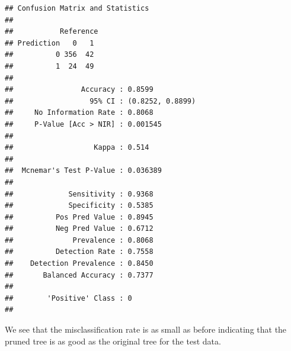 \documentclass[10pt,ignorenonframetext,]{beamer}
\newenvironment{Shaded}{\begin{snugshade}}{\end{snugshade}}
\newcommand{\KeywordTok}[1]{\textcolor[rgb]{0.13,0.29,0.53}{\textbf{#1}}}
\newcommand{\DataTypeTok}[1]{\textcolor[rgb]{0.13,0.29,0.53}{#1}}
\newcommand{\StringTok}[1]{\textcolor[rgb]{0.31,0.60,0.02}{#1}}
\newcommand{\OperatorTok}[1]{\textcolor[rgb]{0.81,0.36,0.00}{\textbf{#1}}}
\newcommand{\NormalTok}[1]{#1}
\begin{document}
\begin{frame}[fragile]

\footnotesize

\begin{Shaded}
\end{Shaded}

\begin{verbatim}
## Confusion Matrix and Statistics
## 
##           Reference
## Prediction   0   1
##          0 356  42
##          1  24  49
##                                           
##                Accuracy : 0.8599          
##                  95% CI : (0.8252, 0.8899)
##     No Information Rate : 0.8068          
##     P-Value [Acc > NIR] : 0.001545        
##                                           
##                   Kappa : 0.514           
##                                           
##  Mcnemar's Test P-Value : 0.036389        
##                                           
##             Sensitivity : 0.9368          
##             Specificity : 0.5385          
##          Pos Pred Value : 0.8945          
##          Neg Pred Value : 0.6712          
##              Prevalence : 0.8068          
##          Detection Rate : 0.7558          
##    Detection Prevalence : 0.8450          
##       Balanced Accuracy : 0.7377          
##                                           
##        'Positive' Class : 0               
## 
\end{verbatim}

\normalsize

We see that the misclassification rate is as small as before indicating
that the pruned tree is as good as the original tree for the test data.

\end{frame}
\end{document}
